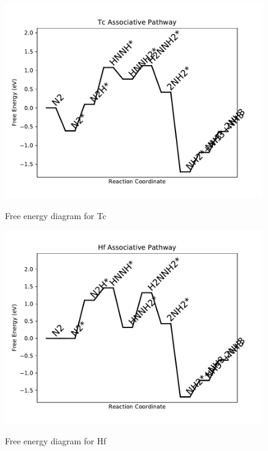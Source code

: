 \documentclass{article}
\begin{document}
\newpage
\begin{figure}
\includegraphics[width=1\linewidth]{data/plots/Tc_associative.pdf}
\label{fig:Tc_associative}
\caption{Free energy diagram for Tc}
\end{figure}

\begin{figure}
\includegraphics[width=1\linewidth]{data/plots/Hf_associative.pdf}
\label{fig:Hf_associative}
\caption{Free energy diagram for Hf}
\end{figure}
\end{document}

